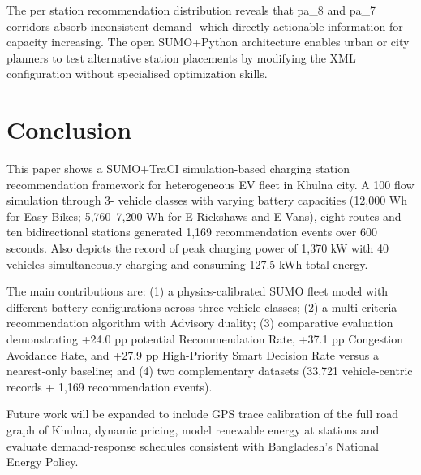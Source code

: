 \documentclass[conference]{IEEEtran}
\begin{document}
The per station recommendation distribution reveals that pa\_8 and
pa\_7 corridors absorb inconsistent demand- which directly actionable
information for capacity increasing. The open SUMO+Python architecture
enables urban or city planners to test alternative station placements
by modifying the XML configuration without specialised optimization
skills.

\section{Conclusion}

This paper shows a SUMO+TraCI simulation-based charging station
recommendation framework for heterogeneous EV fleet in Khulna city. A
100 flow simulation through 3- vehicle classes with varying battery
capacities (12,000 Wh for Easy Bikes; 5,760--7,200 Wh for E-Rickshaws
and E-Vans), eight routes and ten bidirectional stations generated 1,169
recommendation events over 600 seconds. Also depicts the record of peak
charging power of 1,370 kW with 40 vehicles simultaneously charging and
consuming 127.5 kWh total energy.

The main contributions are: (1) a physics-calibrated SUMO fleet model
with different battery configurations across three vehicle classes;
(2) a multi-criteria recommendation algorithm with Advisory duality;
(3) comparative evaluation demonstrating +24.0 pp potential
Recommendation Rate, +37.1 pp Congestion Avoidance Rate, and +27.9 pp
High-Priority Smart Decision Rate versus a nearest-only baseline; and
(4) two complementary datasets (33,721 vehicle-centric records +
1,169 recommendation events).

Future work will be expanded to include GPS trace calibration of the
full road graph of Khulna, dynamic pricing, model renewable energy at
stations and evaluate demand-response schedules consistent with
Bangladesh's National Energy Policy.
\end{document}

